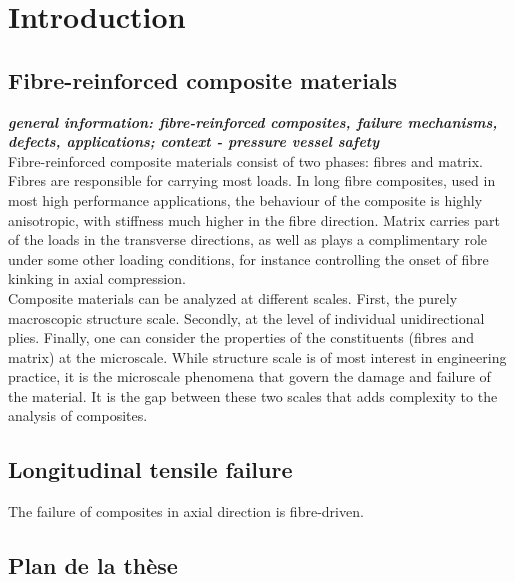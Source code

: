 \chapter{Introduction}

\section{Fibre-reinforced composite materials}

\textit{\textbf{general information: fibre-reinforced composites, failure mechanisms, defects, applications; context - pressure vessel safety}} \\

Fibre-reinforced composite materials consist of two phases: fibres and matrix. Fibres are responsible for carrying most loads. In long fibre composites, used in most high performance applications, the behaviour of the composite is highly anisotropic, with stiffness much higher in the fibre direction. Matrix carries part of the loads in the transverse directions, as well as plays a complimentary role under some other loading conditions, for instance controlling the onset of fibre kinking in axial compression. \\

Composite materials can be analyzed at different scales. First, the purely macroscopic structure scale. Secondly, at the level of individual unidirectional plies. Finally, one can consider the properties of the constituents (fibres and matrix) at the microscale. While structure scale is of most interest in engineering practice, it is the microscale phenomena that govern the damage and failure of the material. It is the gap between these two scales that adds complexity to the analysis of composites. \\

\section{Longitudinal tensile failure}

The failure of composites in axial direction is fibre-driven.

\pagebreak

\section{Plan de la thèse}

